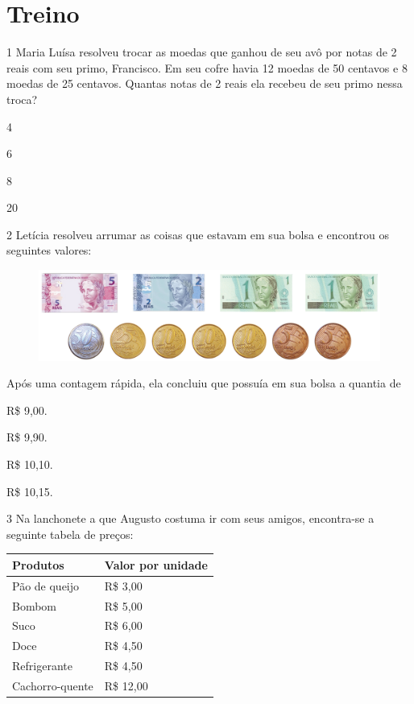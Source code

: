\section*{Treino}

\num{1} Maria Luísa resolveu trocar as moedas que ganhou de seu avô por
notas de 2 reais com seu primo, Francisco. Em seu cofre havia 12 moedas de 50 centavos e 8 moedas de 25 centavos. Quantas notas de 2
reais ela recebeu de seu primo nessa troca?

\begin{minipage}{.5\textwidth}
\begin{escolha}
\item
  4
\item
  6
\item
  8
\item
  20
\end{escolha}
\end{minipage}


\pagebreak

\num{2} Letícia resolveu arrumar as coisas que estavam em sua bolsa e
encontrou os seguintes valores:

\begin{figure}[htpb!]
\includegraphics[width=\textwidth]{../ilustracoes/MAT5/SAEB_5ANO_MAT_figura56.png}
\end{figure}

Após uma contagem rápida, ela concluiu que possuía em sua bolsa a quantia de

\begin{minipage}{.5\textwidth}
\begin{escolha}
\item
  R\$ 9,00.
\item
  R\$ 9,90.
\item
  R\$ 10,10.
\item
  R\$ 10,15.
\end{escolha}
\end{minipage}


\num{3} Na lanchonete a que Augusto costuma ir com seus amigos, encontra-se a
seguinte tabela de preços:

\begin{longtable}[]{@{}ll@{}}
\toprule
Produtos & Valor por unidade\tabularnewline
\midrule
\endhead
Pão de queijo & R\$ 3,00\tabularnewline
Bombom & R\$ 5,00\tabularnewline
Suco & R\$ 6,00\tabularnewline
Doce & R\$ 4,50\tabularnewline
Refrigerante & R\$ 4,50\tabularnewline
Cachorro-quente & R\$ 12,00\tabularnewline
\bottomrule
\end{longtable}

